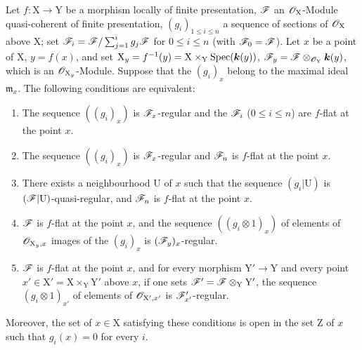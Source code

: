 \begin{theorem}[11.3.8]
\label{IV.11.3.8}
Let $f:\mathrm{X}\to\mathrm{Y}$ be a morphism locally of finite presentation, $\mathscr{F}$ an $\mathscr{O}_\mathrm{X}$-Module quasi-coherent of finite presentation, $(g_i)_{1\leqslant i\leqslant n}$ a sequence of sections of $\mathscr{O}_\mathrm{X}$ above $\mathrm{X}$; set $\mathscr{F}_i=\mathscr{F}/\sum_{j=1}^{i}g_j\mathscr{F}$ for $0\leqslant i\leqslant n$ \textup{(}with $\mathscr{F}_0=\mathscr{F}$\textup{)}. Let $x$ be a point of $\mathrm{X}$, $y=f(x)$, and set $\mathrm{X}_y=f^{-1}(y)=\mathrm{X}\times_\mathrm{Y}\operatorname{Spec}(\boldsymbol{k}(y))$, $\mathscr{F}_y=\mathscr{F}\otimes_{\mathscr{O}_\mathrm{Y}}\boldsymbol{k}(y)$, which is an $\mathscr{O}_{\mathrm{X}_y}$-Module. Suppose that the $(g_i)_x$ belong to the maximal ideal $\mathfrak{m}_x$. The following conditions are equivalent:
\begin{enumerate}[label=\emph{\alph*)}]
  \item The sequence $((g_i)_x)$ is $\mathscr{F}_x$-regular and the $\mathscr{F}_i$ ($0\leqslant i\leqslant n$) are $f$-flat at the point $x$.
  \item The sequence $((g_i)_x)$ is $\mathscr{F}_x$-regular and $\mathscr{F}_n$ is $f$-flat at the point $x$.
  \item[\emph{b$'$)}] There exists a neighbourhood $\mathrm{U}$ of $x$ such that the sequence $(g_i|\mathrm{U})$ is $(\mathscr{F}|\mathrm{U})$-quasi-regular, and $\mathscr{F}_n$ is $f$-flat at the point $x$.
  \item $\mathscr{F}$ is $f$-flat at the point $x$, and the sequence $((g_i\otimes 1)_x)$ of elements of $\mathscr{O}_{\mathrm{X}_y,x}$ images of the $(g_i)_x$ is $(\mathscr{F}_y)_x$-regular.
  \item $\mathscr{F}$ is $f$-flat at the point $x$, and for every morphism $\mathrm{Y}'\to\mathrm{Y}$ and every point $x'\in\mathrm{X}'=\mathrm{X}\times_\mathrm{Y}\mathrm{Y}'$ above $x$, if one sets $\mathscr{F}'=\mathscr{F}\otimes_\mathrm{Y}\mathrm{Y}'$, the sequence $(g_i\otimes 1)_{x'}$ of elements of $\mathscr{O}_{\mathrm{X}',x'}$ is $\mathscr{F}'_{x'}$-regular.
\end{enumerate}
Moreover, the set of $x\in\mathrm{X}$ satisfying these conditions is open in the set $\mathrm{Z}$ of $x$ such that $g_i(x)=0$ for every $i$.
\end{theorem}


